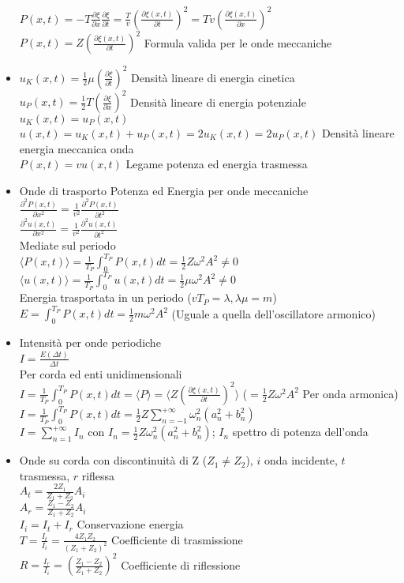 \documentclass[a4paper]{article}
\begin{document}
\begin{itemize}
 	$P(x,t)=-T \frac{\partial \xi}{\partial x} \frac{\partial \xi}{\partial t}=\frac{T}{v}(\frac{\partial \xi(x,t)}{\partial t})^2 =Tv(\frac{\partial \xi(x,t)}{\partial x})^2$\\
 	$P(x,t)=Z(\frac{\partial \xi(x,t)}{\partial t})^2$ Formula valida per le onde meccaniche
 	\item $u_K(x,t)=\frac{1}{2}\mu(\frac{\partial \xi}{\partial t})^2$ Densità lineare di energia cinetica\\
 	$u_P(x,t)=\frac{1}{2}T(\frac{\partial \xi}{\partial x})^2$ Densità lineare di energia potenziale\\
 	$u_K(x,t)=u_P(x,t)$\\
 	$u(x,t) = u_K(x,t)+u_P(x,t) =2u_K(x,t)=2u_P(x,t)$ Densità lineare energia meccanica onda\\
 	$P(x,t)=v u(x,t)$ Legame potenza ed energia trasmessa
 	\item Onde di trasporto Potenza ed Energia per onde meccaniche\\
 	$\frac{\partial^2 P(x,t)}{\partial x^2}=\frac{1}{v^2}\frac{\partial^2P(x,t)}{\partial t^2}$\\
 	$\frac{\partial^2 u(x,t)}{\partial x^2}=\frac{1}{v^2}\frac{\partial^2u(x,t)}{\partial t^2}$\\
 	Mediate sul periodo\\
 	$\langle P(x,t) \rangle =\frac{1}{T_P} \int_{0}^{T_P}P(x,t)dt=\frac{1}{2}Z \omega^2 A^2 \neq 0$\\
 	$\langle u(x,t) \rangle =\frac{1}{T_P} \int_{0}^{T_P}u(x,t)dt=\frac{1}{2}\mu \omega^2 A^2 \neq 0$\\
 	Energia trasportata in un periodo ($v T_P=\lambda, \lambda \mu =m$)\\
 	$E=\int_{0}^{T_P}P(x,t)dt=\frac{1}{2}m \omega^2 A^2$ \hspace{5mm} (Uguale a quella dell'oscillatore armonico)
 	\item Intensità per onde periodiche\\
 	$I=\frac{E(\Delta t)}{\Delta t}$\\
 	Per corda ed enti unidimensionali\\
 	$I=\frac{1}{T_P}\int_{0}^{T_P}P(x,t)dt=\langle P \rangle= \langle Z(\frac{\partial \xi (x,t)}{\partial t})^2 \rangle $ ($=\frac{1}{2}Z\omega^2 A^2$ Per onda armonica)\\
 	$I=\frac{1}{T_P} \int_{0}^{T_P} P(x,t) d t= \frac{1}{2} Z \sum_{n=-1}^{+\infty} \omega_n^2 (a_n^2+b_n^2)$\\
 	$I=\sum_{n=1}^{+\infty} I_n$ con $I_n=\frac{1}{2}Z\omega_n^2(a_n^2+b_n^2)$; $I_n$ spettro di potenza dell'onda
 	\item Onde su corda con discontinuità di Z ($Z_1\neq Z_2$), $i$ onda incidente, $t$ trasmessa, $r$ riflessa\\
 	$A_t=\frac{2Z_1}{Z_1+Z_2}A_i$\\
 	$A_r=\frac{Z_1-Z_2}{Z_1+Z_2}A_i$\\
 	$I_i=I_t+I_r$ Conservazione energia\\
 	$T=\frac{I_t}{I_i}=\frac{4Z_1 Z_2}{(Z_1+Z_2)^2}$ Coefficiente di trasmissione\\
 	$R=\frac{I_r}{I_i}=(\frac{Z_1-Z_2}{Z_1+Z_2})^2$ Coefficiente di riflessione
 	

\end{itemize}
\end{document}
